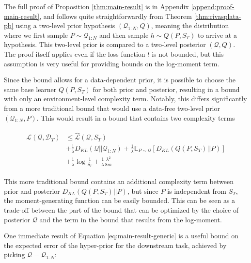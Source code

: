 \documentclass{article}
\theoremstyle{definition}
\newcommand{\Expect}[2]{\mathbb{E}_{#1}\left [#2 \right ]}
\begin{document}
The full proof of Proposition \ref{thm:main-result} is in Appendix \ref{append:proof-main-result}, and follows quite straightforwardly from Theorem \ref{thm:rivasplata-pb} using a two-level prior hypothesis $(\mathcal{Q}_{1:N}, Q)$, meaning the distribution where we first sample $P\sim \mathcal{Q}_{1:N}$ and then sample $h\sim Q(P, S_T)$ to arrive at a hypothesis. This two-level prior is compared to a two-level posterior $(\mathcal{Q}, Q)$. The proof itself applies even if the loss function $l$ is not bounded, but this assumption is very useful for providing bounds on the log-moment term.

Since the bound allows for a data-dependent prior, it is possible to choose the same base learner $Q(P, S_T)$ for both prior and posterior, resulting in a bound with only an environment-level complexity term. 
Notably, this differs significantly from a more traditional bound that would use a data-free two-level prior $(\mathcal{Q}_{1:N}, P)$. This would result in a bound that contains two complexity terms

\begin{align*}
\begin{split}
\mathcal{L}(\mathcal{Q}, \mathcal{D}_T) &\leq \hat{\mathcal{L}}(\mathcal{Q}, S_T) \\
&+ \frac{1}{\lambda}D_{KL}(\mathcal{Q}||\mathcal{Q}_{1:N}) + \frac{1}{\lambda}\Expect{P\sim \mathcal{Q}}{D_{KL}(Q(P,S_T)||P)}\\
&+\frac{1}{\lambda}\log\frac{1}{\delta_T}+\frac{1}{\lambda}\frac{\lambda^2}{8m}
\end{split}
\end{align*}

This more traditional bound contains an additional complexity term between prior and posterior $D_{KL}(Q(P,S_T)||P)$, but since $P$ is independent from $S_T$, the moment-generating function can be easily bounded. This can be seen as a trade-off between the part of the bound that can be optimized by the choice of posterior $\mathcal{Q}$ and the term in the bound that results from the log-moment.

One immediate result of Equation \ref{eq:main-result-generic} is a useful bound on the expected error of the hyper-prior for the downstream task, achieved by picking $\mathcal{Q}=\mathcal{Q}_{1:N}$:
\end{document}

